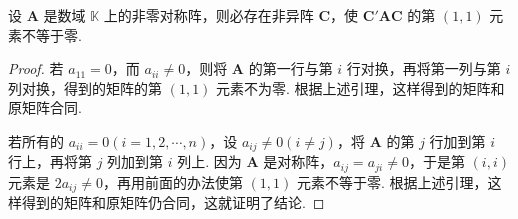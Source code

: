 \documentclass[../../main.tex]{subfiles}%
\begin{document}
\begin{lemma}\label{lemma:非零对称阵合同于(1,1)元素不为零的矩阵}
设 $\boldsymbol{A}$ 是数域 $\mathbb{K}$ 上的非零对称阵，则必存在非异阵 $\boldsymbol{C}$，使 $\boldsymbol{C}'\boldsymbol{A}\boldsymbol{C}$ 的第 $(1,1)$ 元素不等于零.
\end{lemma}
\begin{proof}
若 $a_{11} = 0$，而 $a_{ii}\neq 0$，则将 $\boldsymbol{A}$ 的第一行与第 $i$ 行对换，再将第一列与第 $i$ 列对换，得到的矩阵的第 $(1,1)$ 元素不为零. 根据上述引理，这样得到的矩阵和原矩阵合同.

若所有的 $a_{ii}=0 (i = 1,2,\cdots,n)$，设 $a_{ij}\neq 0 (i\neq j)$，将 $\boldsymbol{A}$ 的第 $j$ 行加到第 $i$ 行上，再将第 $j$ 列加到第 $i$ 列上. 因为 $\boldsymbol{A}$ 是对称阵，$a_{ij}=a_{ji}\neq 0$，于是第 $(i,i)$ 元素是 $2a_{ij}\neq 0$，再用前面的办法使第 $(1,1)$ 元素不等于零. 根据上述引理，这样得到的矩阵和原矩阵仍合同，这就证明了结论. 
\end{proof}
\end{document}
